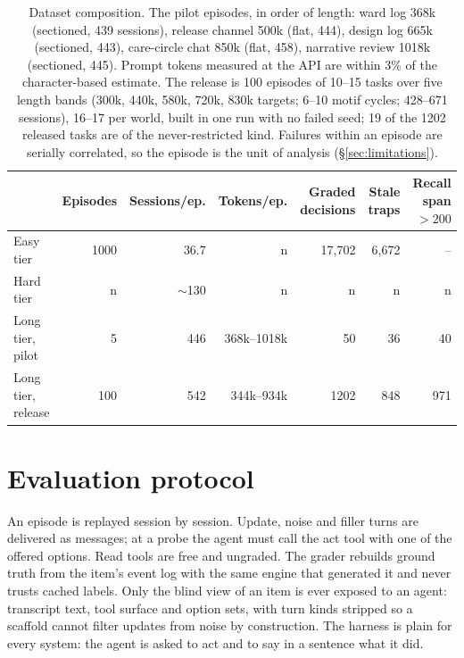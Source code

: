 \documentclass{article} %
\newcommand{\ph}[1]{#1}
\newcommand{\pilot}{}
\newcommand{\ph}[1]{\colorbox{phbg}{\textcolor{phfg}{\small\texttt{#1}}}}
\newcommand{\pilot}{\textcolor{pilotfg}{\textsc{\scriptsize pilot}}}
\begin{document}
\begin{table}[t]
\centering\small
\begin{tabular}{@{}lrrrrrr@{}}
\toprule
 & Episodes & Sessions/ep. & Tokens/ep. & Graded decisions & Stale traps & Recall span $>200$ \\
\midrule
Easy tier & \ph{1000} & \ph{36.7} & \ph{n} & \ph{17,702} & \ph{6,672} & -- \\
Hard tier & \ph{n} & \ph{$\sim$130} & \ph{n} & \ph{n} & \ph{n} & \ph{n} \\
Long tier, pilot~\pilot & 5 & 446 & 368k--1018k & 50 & 36 & 40 \\
Long tier, release & 100 & 542 & 344k--934k & 1202 & 848 & 971 \\
\bottomrule
\end{tabular}
\caption{Dataset composition. The pilot episodes, in order of length: ward log 368k (sectioned, 439 sessions), release channel 500k (flat, 444), design log 665k (sectioned, 443), care-circle chat 850k (flat, 458), narrative review 1018k (sectioned, 445). Prompt tokens measured at the API are within 3\% of the character-based estimate. The release is 100 episodes of 10--15 tasks over five length bands (300k, 440k, 580k, 720k, 830k targets; 6--10 motif cycles; 428--671 sessions), 16--17 per world, built in one run with no failed seed; 19 of the 1202 released tasks are of the never-restricted kind. Failures within an episode are serially correlated, so the episode is the unit of analysis (\S\ref{sec:limitations}).}
\label{tab:dataset}
\end{table}

\section{Evaluation protocol}
\label{sec:protocol}

An episode is replayed session by session. Update, noise and filler turns are delivered as messages; at a probe the agent must call the act tool with one of the offered options. Read tools are free and ungraded. The grader rebuilds ground truth from the item's event log with the same engine that generated it and never trusts cached labels. Only the blind view of an item is ever exposed to an agent: transcript text, tool surface and option sets, with turn kinds stripped so a scaffold cannot filter updates from noise by construction. The harness is plain for every system: the agent is asked to act and to say in a sentence what it did.
\end{document}
